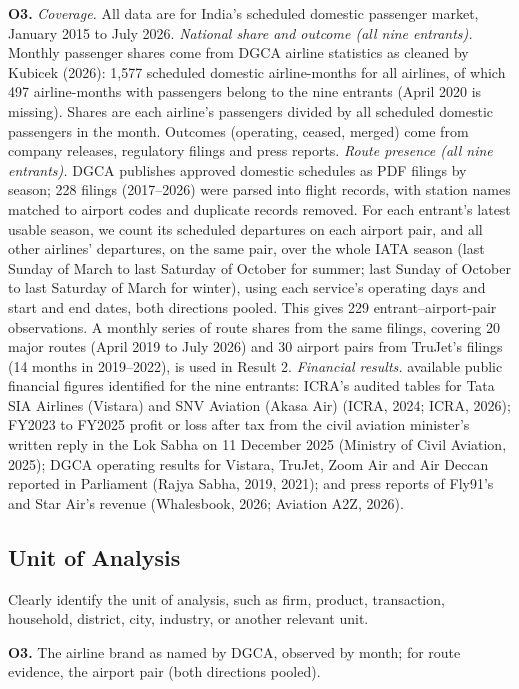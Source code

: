 \documentclass[12pt,a4paper]{article}
\newenvironment{o3box}{\ifthenelse{\boolean{o3highlight}}{\begingroup\color{o3sky}}{}}{\ifthenelse{\boolean{o3highlight}}{\endgroup}{}}
\begin{document}
\begin{o3box}
\textbf{O3.} \emph{Coverage.} All data are for India's scheduled domestic passenger market, January 2015 to July 2026. \emph{National share and outcome (all nine entrants).} Monthly passenger shares come from DGCA airline statistics as cleaned by Kubicek (2026): 1,577 scheduled domestic airline-months for all airlines, of which 497 airline-months with passengers belong to the nine entrants (April 2020 is missing). Shares are each airline's passengers divided by all scheduled domestic passengers in the month. Outcomes (operating, ceased, merged) come from company releases, regulatory filings and press reports. \emph{Route presence (all nine entrants).} DGCA publishes approved domestic schedules as PDF filings by season; 228 filings (2017--2026) were parsed into flight records, with station names matched to airport codes and duplicate records removed. For each entrant's latest usable season, we count its scheduled departures on each airport pair, and all other airlines' departures, on the same pair, over the whole IATA season (last Sunday of March to last Saturday of October for summer; last Sunday of October to last Saturday of March for winter), using each service's operating days and start and end dates, both directions pooled. This gives 229 entrant--airport-pair observations. A monthly series of route shares from the same filings, covering 20 major routes (April 2019 to July 2026) and 30 airport pairs from TruJet's filings (14 months in 2019--2022), is used in Result 2. \emph{Financial results.} available public financial figures identified for the nine entrants: ICRA's audited tables for Tata SIA Airlines (Vistara) and SNV Aviation (Akasa Air) (ICRA, 2024; ICRA, 2026); FY2023 to FY2025 profit or loss after tax from the civil aviation minister's written reply in the Lok Sabha on 11 December 2025 (Ministry of Civil Aviation, 2025); DGCA operating results for Vistara, TruJet, Zoom Air and Air Deccan reported in Parliament (Rajya Sabha, 2019, 2021); and press reports of Fly91's and Star Air's revenue (Whalesbook, 2026; Aviation A2Z, 2026).
\end{o3box}

\subsection{Unit of Analysis}
Clearly identify the unit of analysis, such as firm, product, transaction, household, district, city, industry, or another relevant unit.

\begin{o3box}
\textbf{O3.} The airline brand as named by DGCA, observed by month; for route evidence, the airport pair (both directions pooled).
\end{o3box}
\end{document}
